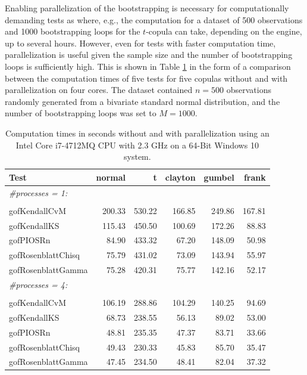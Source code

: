 Enabling parallelization of the bootstrapping is necessary for computationally demanding tests as  where, e.g., the computation for a dataset of 500 observations and 1000 bootstrapping loops for the $t$-copula can take, depending on the engine, up to several hours. However, even for tests with faster computation time, parallelization is useful given the sample size and the number of bootstrapping loops is sufficiently high. This is shown in Table \ref{Time_Fast_Tests} in the form of a comparison between the computation times of five tests \mycolor for five copulas \bk without and with parallelization on four cores. The dataset contained \mycolor $n = 500$ \bk observations randomly generated from a bivariate standard normal distribution, and the number of bootstrapping loops was set to $M = 1000$.

\begin{table}[H]
\centering
\mycolor
\begin{tabular}{lrrrrr}
  \toprule
Test & normal & t & clayton & gumbel & frank \\ 
  \midrule
  \multicolumn{1}{l}{\textit{\#processes = 1:}}\\
  & & & & &\\
  gofKendallCvM & 200.33 & 530.22 & 166.85 & 249.86 & 167.81 \\ 
  gofKendallKS & 115.43 & 450.50 & 100.69 & 172.26 & 88.83 \\ 
  gofPIOSRn & 84.90 & 433.32 & 67.20 & 148.09 & 50.98 \\ 
  gofRosenblattChisq & 75.79 & 431.02 & 73.09 & 143.94 & 55.97 \\ 
  gofRosenblattGamma & 75.28 & 420.31 & 75.77 & 142.16 & 52.17 \\ 
   \midrule
  \multicolumn{1}{l}{\textit{\#processes = 4:}}\\
  & & & & &\\
  gofKendallCvM & 106.19 & 288.86 & 104.29 & 140.25 & 94.69 \\ 
  gofKendallKS & 68.73 & 238.55 & 56.13 & 89.02 & 53.00 \\ 
  gofPIOSRn & 48.81 & 235.35 & 47.37 & 83.71 & 33.66 \\ 
  gofRosenblattChisq & 49.43 & 230.33 & 45.83 & 85.70 & 35.47 \\ 
  gofRosenblattGamma & 47.45 & 234.50 & 48.41 & 82.04 & 37.32 \\  
   \bottomrule
\end{tabular} \bk
\caption{Computation times in seconds without and with parallelization using an Intel Core i7-4712MQ CPU with 2.3 GHz on a 64-Bit Windows 10 system.}
\label{Time_Fast_Tests}
\end{table}
